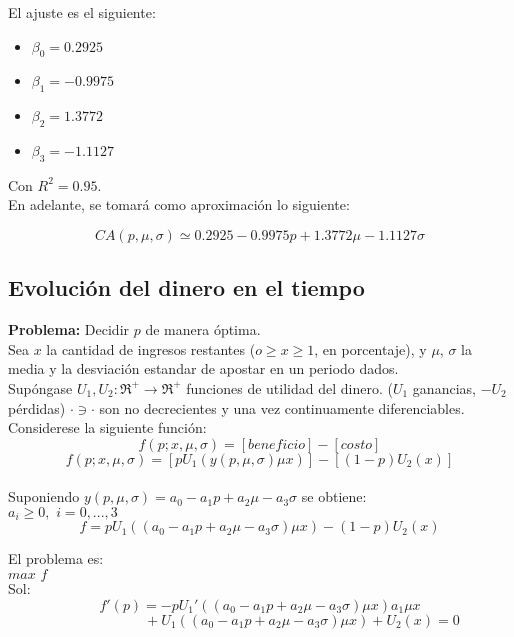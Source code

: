  El ajuste es el siguiente:

 \begin{itemize}
  \item $\beta_0=0.2925$
   \item $\beta_1=-0.9975$
  \item $\beta_2=1.3772$
  \item $\beta_3=-1.1127$
 \end{itemize}

 Con $R^2=0.95$.\\

 En adelante, se tomará como aproximación lo siguiente:

 \[CA(p,\mu,\sigma)\simeq0.2925-0.9975p+1.3772\mu-1.1127\sigma\]

 \subsection{Evolución del dinero en el tiempo}
 \label{sec:evolucion-dinero}
 {\bf Problema:} Decidir $p$ de manera óptima.\\

 Sea $x$ la cantidad de ingresos restantes ($o\ge x\ge1$, en porcentaje), y $\mu$, $\sigma$ la media y la desviación estandar de apostar en un periodo dados.\\

 Supóngase $U_1,U_2: \Re^+\rightarrow \Re^+$ funciones de utilidad del dinero. ($U_1$ ganancias, $-U_2$ pérdidas) $\cdot\ni\cdot$ son no decrecientes y una vez continuamente diferenciables. Considerese la siguiente función:\\

 \[f(p;x,\mu,\sigma)=[beneficio]-[costo]\]
 \[f(p;x,\mu,\sigma)=[pU_1(y(p,\mu,\sigma)\mu x)]-[(1-p)U_2(x)]\]\\

 Suponiendo $y(p,\mu,\sigma)=a_0-a_1p+a_2\mu-a_3\sigma$ se obtiene:\\

 $a_i\ge 0,\,\,i=0,...,3$
 \[f=pU_1((a_0-a_1p+a_2\mu-a_3\sigma)\mu x)-(1-p)U_2(x)\]

 El problema es:\\

 $max\,\,f$\\

 Sol:\\

 \[f'(p)=-pU_1'((a_0-a_1p+a_2\mu-a_3\sigma)\mu x)a_1\mu x\]
 \[\qquad\qquad\qquad+U_1((a_0-a_1p+a_2\mu-a_3\sigma)\mu x)+U_2(x)=0\]

